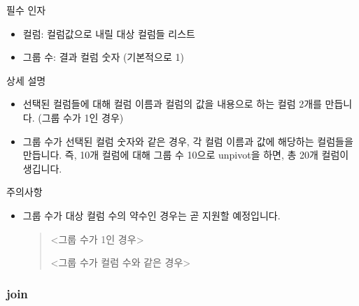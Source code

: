 \documentclass[letterpaper,10pt,english]{sphinxmanual}
\begin{document}
필수 인자
\begin{itemize}
\item {} 
컬럼: 컬럼값으로 내릴 대상 컬럼들 리스트

\item {} 
그룹 수: 결과 컬럼 숫자 (기본적으로 1)

\end{itemize}

상세 설명
\begin{itemize}
\item {} 
선택된 컬럼들에 대해 컬럼 이름과 컬럼의 값을 내용으로 하는 컬럼 2개를 만듭니다. (그룹 수가 1인 경우)

\item {} 
그룹 수가 선택된 컬럼 숫자와 같은 경우, 각 컬럼 이름과 값에 해당하는 컬럼들을 만듭니다. 즉, 10개 컬럼에 대해 그룹 수 10으로 unpivot을 하면, 총 20개 컬럼이 생깁니다.

\end{itemize}

주의사항
\begin{itemize}
\item {} 
그룹 수가 대상 컬럼 수의 약수인 경우는 곧 지원할 예정입니다.
\begin{quote}

\textless{}그룹 수가 1인 경우\textgreater{}
\begin{quote}

\begin{figure}[H]
\centering

\noindent{}
\end{figure}
\end{quote}

\textless{}그룹 수가 컬럼 수와 같은 경우\textgreater{}
\begin{quote}

\begin{figure}[H]
\centering

\noindent{}
\end{figure}
\end{quote}
\end{quote}

\end{itemize}


\subsubsection{join}
\label{\detokenize{discovery/part07/rule_kinds:join}}
\begin{figure}[H]
\centering

\noindent{}
\end{figure}
\end{document}
